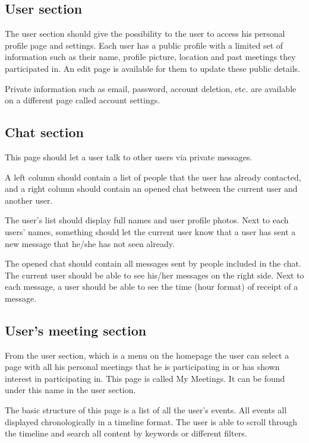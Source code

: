 \documentclass[conference]{IEEEtran}
\begin{document}
\subsection{User section}

The user section should give the possibility to the user to
access his personal profile page and settings. Each user has a public profile with a limited set of information such as their name, profile picture, location and past meetings they participated in. An edit page is available for them to update these public details.

Private information such as email, password, account deletion, etc. are available on a different page called account settings.

\subsection{Chat section}

This page should let a user talk to other users via private
messages.

A left column should contain a list of people that the user
has already contacted, and a right column should contain an opened chat between the current user and another user.

The user’s list should display full names and user profile photos. Next to each users' names, something should let the current user know that a user has sent a new message that he/she has not seen already.

The opened chat should contain all messages sent by people included in the chat. The current user should be able to see his/her messages on the right side. Next to each message, a user should be able to see the time (hour format) of receipt of a message.

\subsection{User’s meeting section}

From the user section, which is a menu on the homepage
the user can select a page with all his personal meetings that he is participating in or has shown interest in participating in. This page is called My Meetings. It can be found under this name in the user section.

The basic structure of this page is a list of all the user’s events. All events all displayed chronologically in a timeline format. The user is able to scroll through the timeline and search all content by keywords or different filters.
\end{document}
